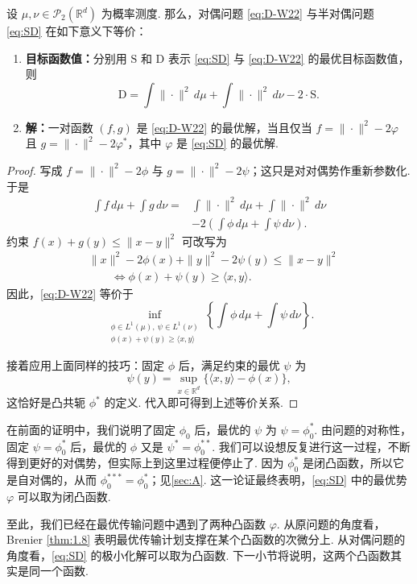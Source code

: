 \begin{proposition}\label{prop:1.13}
设 $\mu,\nu\in\mathcal{P}_2(\mathbb{R}^d)$ 为概率测度. 那么，对偶问题 \eqref{eq:D-W22} 与半对偶问题 \eqref{eq:SD} 在如下意义下等价：
\begin{enumerate}
\item \textbf{目标函数值：}分别用 $\mathrm{S}$ 和 $\mathrm{D}$ 表示 \eqref{eq:SD} 与 \eqref{eq:D-W22} 的最优目标函数值，则
$$
\mathrm{D}=\int\|\cdot\|^2\,d\mu+\int\|\cdot\|^2\,d\nu-2\cdot\mathrm{S}.
$$
\item \textbf{解：}一对函数 $(f,g)$ 是 \eqref{eq:D-W22} 的最优解，当且仅当 $f=\|\cdot\|^2-2\varphi$ 且 $g=\|\cdot\|^2-2\varphi^*$，其中 $\varphi$ 是 \eqref{eq:SD} 的最优解.
\end{enumerate}
\end{proposition}
\begin{proof}
写成 $f=\|\cdot\|^2-2\phi$ 与 $g=\|\cdot\|^2-2\psi$；这只是对对偶势作重新参数化. 于是
$$
\begin{aligned}
\int f\,d\mu+\int g\,d\nu
={}&\int\|\cdot\|^2\,d\mu+\int\|\cdot\|^2\,d\nu\\
&-2\left(\int\phi\,d\mu+\int\psi\,d\nu\right).
\end{aligned}
$$
约束 $f(x)+g(y)\leq\|x-y\|^2$ 可改写为
$$
\begin{aligned}
&\|x\|^2-2\phi(x)+\|y\|^2-2\psi(y)\leq\|x-y\|^2\\
&\qquad\iff\phi(x)+\psi(y)\geq\langle x,y\rangle.
\end{aligned}
$$
因此，\eqref{eq:D-W22} 等价于
$$
\inf_{\substack{\phi\in L^1(\mu),\ \psi\in L^1(\nu)\\
\phi(x)+\psi(y)\geq\langle x,y\rangle}}
\left\{\int\phi\,d\mu+\int\psi\,d\nu\right\}.
$$

接着应用上面同样的技巧：固定 $\phi$ 后，满足约束的最优 $\psi$ 为
$$
\psi(y)=\sup_{x\in\mathbb{R}^d}\{\langle x,y\rangle-\phi(x)\},
$$
这恰好是凸共轭 $\phi^*$ 的定义. 代入即可得到上述等价关系.
\end{proof}

在前面的证明中，我们说明了固定 $\phi_0$ 后，最优的 $\psi$ 为 $\psi=\phi_0^*$. 由问题的对称性，固定 $\psi=\phi_0^*$ 后，最优的 $\phi$ 又是 $\psi^*=\phi_0^{**}$. 我们可以设想反复进行这一过程，不断得到更好的对偶势，但实际上到这里过程便停止了. 因为 $\phi_0^*$ 是闭凸函数，所以它是自对偶的，从而 $\phi_0^{***}=\phi_0^*$；见\autoref{sec:A}. 这一论证最终表明，\eqref{eq:SD} 中的最优势 $\varphi$ 可以取为闭凸函数.

至此，我们已经在最优传输问题中遇到了两种凸函数 $\varphi$. 从原问题的角度看，Brenier \autoref{thm:1.8} 表明最优传输计划支撑在某个凸函数的次微分上. 从对偶问题的角度看，\eqref{eq:SD} 的极小化解可以取为凸函数. 下一小节将说明，这两个凸函数其实是同一个函数.


